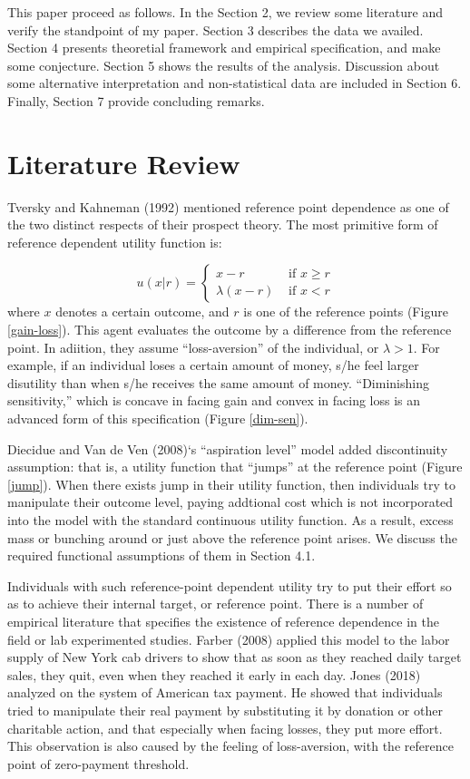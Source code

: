 \documentclass[dvipdfmx, 12pt]{article}
\begin{document}
This paper proceed as follows. In the Section 2, we review some literature and verify the standpoint of my paper. Section 3 describes the data we availed. Section 4 presents theoretial framework and empirical  specification, and make some conjecture.  Section 5 shows the results of the analysis. Discussion about some alternative interpretation and non-statistical data are included in Section 6. Finally, Section 7 provide concluding remarks.

\section{Literature Review}

  Tversky and Kahneman (1992) mentioned reference point dependence as one of the two distinct respects of their prospect theory. The most primitive form of reference dependent utility function is:

   \[
  u(x | r) = \begin{cases}
  x - r & \text{ if }x \geq r \\
  \lambda (x - r) & \text{ if }x < r
\end{cases}
  \]
  where $x$ denotes a certain outcome, and $r$ is one of the reference points (Figure \ref{gain-loss}). This agent evaluates the outcome by a difference from the reference point. In adiition, they assume ``loss-aversion'' of the individual, or $\lambda > 1$. For example, if an individual loses a certain amount of money, s/he feel larger disutility than when s/he receives the same amount of money. ``Diminishing sensitivity,'' which is concave in facing gain and convex in facing loss is an advanced form of this specification (Figure \ref{dim-sen}).

  Diecidue and Van de Ven (2008)`s ``aspiration level'' model added discontinuity assumption: that is, a utility function that ``jumps'' at the reference point (Figure \ref{jump}). When there exists jump in their utility function, then individuals try to manipulate their outcome level, paying addtional cost which is not incorporated into the model with the standard continuous utility function. As a result,  excess mass or bunching around or just above the reference point arises. We discuss the required functional assumptions of them in Section 4.1.

  Individuals with such reference-point dependent utility try to put their effort so as to achieve their internal target, or reference point. There is a number of empirical literature that specifies the existence of reference dependence in the field or lab experimented studies. Farber (2008) applied this model to the labor supply of New York cab drivers to show that as soon as they reached daily target sales, they quit, even when they reached it early in each day. Jones (2018) analyzed on the system of American tax payment. He showed that individuals tried to manipulate their real payment by substituting it by donation or other charitable action, and that especially when facing losses, they put more effort. This observation is also caused by the feeling of loss-aversion, with the reference point of zero-payment threshold.
\end{document}
